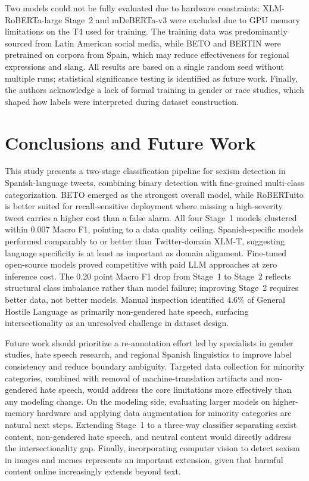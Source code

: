 \documentclass[runningheads]{llncs}
\begin{document}
Two models could not be fully evaluated due to hardware constraints: XLM-RoBERTa-large
Stage~2 and mDeBERTa-v3 were excluded due to GPU memory limitations on the T4
used for training. The training data was predominantly sourced from Latin American
social media, while BETO and BERTIN were pretrained on corpora from Spain, which
may reduce effectiveness for regional expressions and slang. All results are based on a
single random seed without multiple runs; statistical significance testing is identified as
future work. Finally, the authors acknowledge a lack of formal training in gender or race
studies, which shaped how labels were interpreted during dataset construction.

\section{Conclusions and Future Work}

This study presents a two-stage classification pipeline for sexism detection in
Spanish-language tweets, combining binary detection with fine-grained multi-class
categorization. BETO emerged as the strongest overall model, while RoBERTuito is
better suited for recall-sensitive deployment where missing a high-severity tweet carries
a higher cost than a false alarm. All four Stage~1 models clustered within 0.007 Macro
F1, pointing to a data quality ceiling. Spanish-specific models performed comparably to
or better than Twitter-domain XLM-T, suggesting language specificity is at least as
important as domain alignment. Fine-tuned open-source models proved competitive with
paid LLM approaches at zero inference cost. The 0.20 point Macro F1 drop from Stage~1
to Stage~2 reflects structural class imbalance rather than model failure; improving
Stage~2 requires better data, not better models. Manual inspection identified 4.6\% of
General Hostile Language as primarily non-gendered hate speech, surfacing
intersectionality as an unresolved challenge in dataset design.

Future work should prioritize a re-annotation effort led by specialists in gender studies,
hate speech research, and regional Spanish linguistics to improve label consistency and
reduce boundary ambiguity. Targeted data collection for minority categories, combined
with removal of machine-translation artifacts and non-gendered hate speech, would
address the core limitations more effectively than any modeling change. On the modeling
side, evaluating larger models on higher-memory hardware and applying data
augmentation for minority categories are natural next steps. Extending Stage~1 to a
three-way classifier separating sexist content, non-gendered hate speech, and neutral
content would directly address the intersectionality gap. Finally, incorporating computer
vision to detect sexism in images and memes represents an important extension, given
that harmful content online increasingly extends beyond text.
\end{document}
